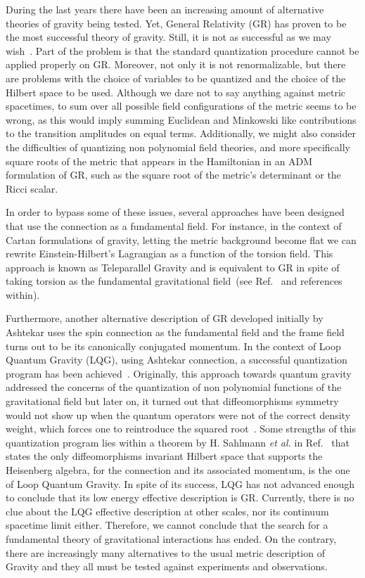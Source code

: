\documentclass[twocolumn,aps,showpacs,showkeys,prl,superscriptaddress]{revtex4-1}
\begin{document}
During the last years there have been an increasing amount of alternative theories of gravity being tested. Yet, General Relativity (GR) has proven to be the most successful theory of gravity.  Still,  it is not as successful as we may wish~\cite{Kiefer:2013jqa}. Part of the problem is that the standard quantization procedure cannot be applied  properly on GR. Moreover, not only it is not renormalizable, but there are  problems with the choice of variables to be quantized and the choice of the Hilbert space to be used. Although we dare not to say anything against metric spacetimes, to sum over all possible field configurations of the metric seems to be wrong, as this would imply summing Euclidean and Minkowski like contributions to the transition amplitudes on equal terms. Additionally, we might also consider the difficulties of  quantizing  non polynomial field theories, and more specifically square roots of the metric that appears in the Hamiltonian in an ADM formulation of GR, such as the square root of the metric's determinant or the Ricci scalar.

In order to bypass some of these issues, several approaches have been designed that use the connection as a fundamental field. For instance, in the context of Cartan formulations of gravity, letting the metric background become flat we can rewrite Einstein-Hilbert's Lagrangian as a function of the torsion field. This approach is known as Teleparallel Gravity and is equivalent to GR in spite of taking torsion as the fundamental gravitational field~(see Ref.~\cite{Teleparallel,Baez:2012bn} and references within).

Furthermore, another alternative description of GR developed initially by Ashtekar uses the spin connection as the fundamental field and the frame field turns out to be its canonically conjugated momentum. In the context of Loop Quantum Gravity (LQG), using Ashtekar connection, a successful quantization program has been achieved~\cite{Ashtekar:2004eh,thiemann2007loop}. Originally, this approach towards quantum gravity addressed the concerns of the quantization of non polynomial functions of the gravitational field but later on, it turned out that diffeomorphisms symmetry would not show up when the quantum operators were not of the correct density weight, which forces one to reintroduce the squared root~\cite{Thiemann:1996aw}.  Some  strengths of this quantization program lies within a theorem by H. Sahlmann \emph{et al.} in Ref.~\cite{Lewandowski:2005jk} that states the only diffeomorphisms invariant Hilbert space that supports the Heisenberg algebra, for the connection and its associated momentum, is the one of Loop Quantum Gravity. In spite of its success, LQG has not advanced enough to conclude that its low energy effective description is GR. Currently, there is no clue about the LQG effective description at other scales,  nor its continuum spacetime limit either. Therefore, we cannot conclude that the search for a fundamental theory of gravitational interactions has ended. On the contrary, there are increasingly many alternatives to the usual metric description of Gravity and they all must be tested against experiments and observations.
\end{document}
